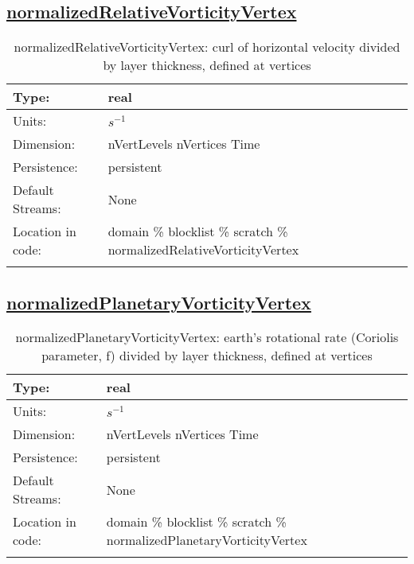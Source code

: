 \subsection[normalizedRelativeVorticityVertex]{\hyperref[sec:var_tab_scratch]{normalizedRelativeVorticityVertex}}
\label{subsec:var_sec_scratch_normalizedRelativeVorticityVertex}
\begin{center}
\begin{longtable}{| p{2.0in} | p{4.0in} |}
        \hline 
        Type: & real \\
        \hline 
        Units: & $s^{-1}$ \\
        \hline 
        Dimension: & nVertLevels nVertices Time \\
        \hline 
        Persistence: & persistent \\
        \hline 
		 Default Streams: & None \\
        \hline 
		 Location in code: & domain \% blocklist \% scratch \% normalizedRelativeVorticityVertex \\
		 \hline 
    \caption{normalizedRelativeVorticityVertex: curl of horizontal velocity divided by layer thickness, defined at vertices}
\end{longtable}
\end{center}
\subsection[normalizedPlanetaryVorticityVertex]{\hyperref[sec:var_tab_scratch]{normalizedPlanetaryVorticityVertex}}
\label{subsec:var_sec_scratch_normalizedPlanetaryVorticityVertex}
\begin{center}
\begin{longtable}{| p{2.0in} | p{4.0in} |}
        \hline 
        Type: & real \\
        \hline 
        Units: & $s^{-1}$ \\
        \hline 
        Dimension: & nVertLevels nVertices Time \\
        \hline 
        Persistence: & persistent \\
        \hline 
		 Default Streams: & None \\
        \hline 
		 Location in code: & domain \% blocklist \% scratch \% normalizedPlanetaryVorticityVertex \\
		 \hline 
    \caption{normalizedPlanetaryVorticityVertex: earth's rotational rate (Coriolis parameter, f) divided by layer thickness, defined at vertices}
\end{longtable}
\end{center}
